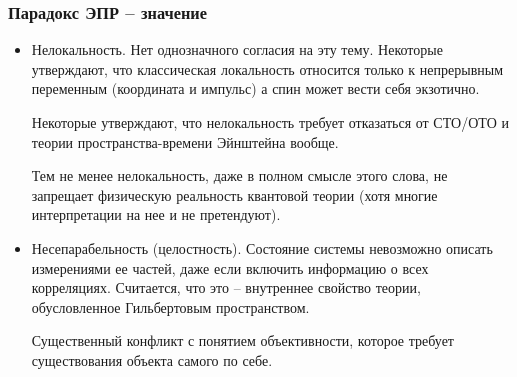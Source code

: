 \documentclass[10pt]{beamer}
\begin{document}
\begin{frame}[label=EPR-consequences]%
  \frametitle{Парадокс ЭПР -- значение}

  \begin{itemize}
    \item Нелокальность.
      Нет однозначного согласия на эту тему. Некоторые утверждают, что 
      классическая локальность относится только к непрерывным переменным 
      (координата и импульс) а спин может вести себя экзотично.

      Некоторые утверждают, что нелокальность требует отказаться от 
      СТО/ОТО и теории пространства-времени Эйнштейна вообще.

      Тем не менее нелокальность, даже в полном смысле этого слова, не 
      запрещает физическую реальность квантовой теории (хотя многие 
      интерпретации на нее и не претендуют).

    \item Несепарабельность (целостность).
      Состояние системы невозможно описать измерениями ее частей, даже 
      если включить информацию о всех корреляциях. Считается, что это -- 
      внутреннее свойство теории, обусловленное Гильбертовым 
      пространством.

      Существенный конфликт с понятием объективности, которое требует 
      существования объекта самого по себе.
  \end{itemize}
\end{frame}%
\end{document}

